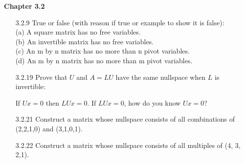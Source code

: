 \documentclass[10pt,twoside,reqno]{article}
\begin{document}
\vspace{5mm}
\textbf{Chapter 3.2}
\begin{enumerate}
\item[3.2.9] True or false (with reason if true or example to show it is false): \\ \vspace{1mm}
{\addtolength{\leftskip}{5mm}
(a) A square matrix has no free variables. \\ \vspace{1mm}
(b) An invertible matrix has no free variables. \\ \vspace{1mm}
(c) An m by n matrix has no more than n pivot variables. \\ \vspace{1mm}
(d) An m by n matrix has no more than m pivot variables. \\
}
\vspace{3mm}


\item[3.2.19] Prove that $U$ and $A = LU$ have the same nullspace when $L$ is invertible: \\
\begin{center}
If $Ux = 0$ then $LUx = 0$. If $LUx = 0$, how do you know $Ux = 0$? \\
\end{center}
\vspace{3mm}



\item[3.2.21] Construct a matrix whose nullspace consists of all combinations of (2,2,1,0) and (3,1,0,1).\\
\vspace{3mm}



\item[3.2.22] Construct a matrix whose nullspace consists of all multiples of (4, 3, 2,1).\\
\vspace{3mm}




\end{enumerate}
\end{document}
